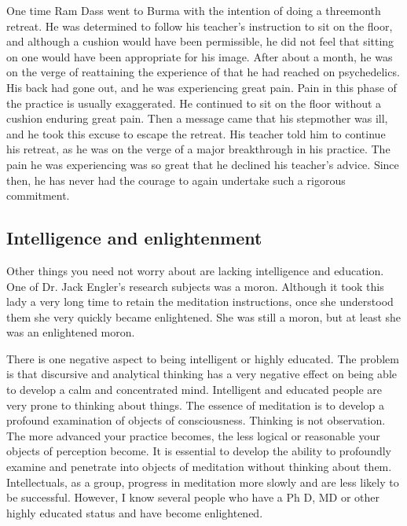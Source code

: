 \documentclass[a5paper,10pt,english]{book}
\begin{document}
\sphinxAtStartPar
One time Ram Dass went to Burma with the intention of doing a
three\sphinxhyphen{}month  retreat. He was determined to follow his
teacher’s instruction to sit on the floor, and although a cushion would
have been permissible, he did not feel that sitting on one would have
been appropriate for his image. After about a month, he was on the verge
of reattaining the experience of  that he had reached on
psychedelics. His back had gone out, and he was experiencing great pain.
Pain in this phase of the practice is usually exaggerated. He continued
to sit on the floor without a cushion enduring great pain. Then a
message came that his stepmother was ill, and he took this excuse to
escape the retreat. His teacher told him to continue his retreat, as he
was on the verge of a major breakthrough in his practice. The pain he
was experiencing was so great that he declined his teacher’s advice.
Since then, he has never had the courage to again undertake such a
rigorous commitment.


\subsection{Intelligence and enlightenment}
\label{\detokenize{saints:intelligence-and-enlightenment}}
\sphinxAtStartPar
Other things you need not worry about are lacking intelligence and
education. One of Dr. Jack Engler’s research subjects was a moron.
Although it took this lady a very long time to retain the meditation
instructions, once she understood them she very quickly became
enlightened. She was still a moron, but at least she was an enlightened
moron.

\sphinxAtStartPar
There is one negative aspect to being intelligent or highly educated.
The problem is that discursive and analytical thinking has a very
negative effect on being able to develop a calm and concentrated mind.
Intelligent and educated people are very prone to thinking about things.
The essence of  meditation is to develop a profound
examination of objects of consciousness. Thinking is not observation.
The more advanced your practice becomes, the less logical or reasonable
your objects of perception become. It is essential to develop the
ability to profoundly examine and penetrate into objects of meditation
without thinking about them. Intellectuals, as a group, progress in
meditation more slowly and are less likely to be successful. However, I
know several people who have a Ph D, MD or other highly educated status
and have become enlightened.
\end{document}
